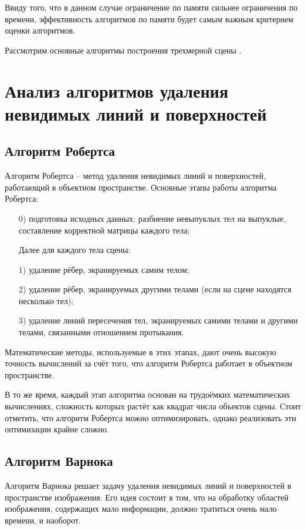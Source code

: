 Ввиду того, что в данном случае ограничение по памяти сильнее ограничения по времени, эффективность алгоритмов по памяти будет самым важным критерием оценки алгоритмов.

Рассмотрим основные алгоритмы построения трехмерной сцены \cite{Rogers}.

\section{Анализ алгоритмов удаления невидимых линий и поверхностей}
\subsection{Алгоритм Робертса}
Алгоритм Робертса – метод удаления невидимых линий и поверхностей, работающий в объектном пространстве. Основные этапы работы алгоритма Робертса:
\begin{enumerate}
	\item[0)] подготовка исходных данных: разбиение невыпуклых тел на выпуклые, составление корректной матрицы каждого тела;
	\item[] Далее для каждого тела сцены:
	\item[1)] удаление рёбер, экранируемых самим телом;
	\item[2)] удаление рёбер, экранируемых другими телами (если на сцене находятся несколько тел);
	\item[3)] удаление линий пересечения тел, экранируемых самими телами и другими телами, связанными отношением протыкания.
\end{enumerate}

Математические методы, используемые в этих этапах, дают очень высокую точность вычислений за счёт того, что алгоритм Робертса работает в объектном пространстве. 

В то же время, каждый этап алгоритма основан на трудоёмких математических вычислениях, сложность которых растёт как квадрат числа объектов сцены. Стоит отметить, что алгоритм Робертса можно оптимизировать, однако реализовать эти оптимизации крайне сложно.

\subsection{Алгоритм Варнока}
Алгоритм Варнока решает задачу удаления невидимых линий и поверхностей в пространстве изображения. Его идея состоит в том, что на обработку областей изображения, содержащих мало информации, должно тратиться очень мало времени, и наоборот. 

